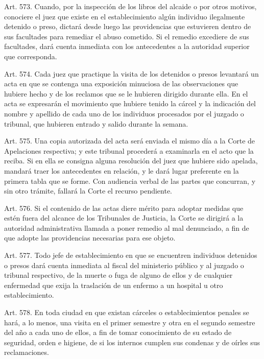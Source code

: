     Art. 573. Cuando, por la inspección de los libros del alcaide o por otros motivos, conociere el juez que existe en el establecimiento algún individuo ilegalmente detenido o preso, dictará desde luego las providencias que estuvieren dentro de sus facultades para remediar el abuso cometido. Si el remedio excediere de sus facultades, dará cuenta inmediata con los antecedentes a la autoridad superior que corresponda.



    Art. 574. Cada juez que practique la visita de los detenidos o presos levantará un acta en que se contenga una exposición minuciosa de las observaciones que hubiere hecho y de los reclamos que se le hubieren dirigido durante ella. En el acta se expresarán el movimiento que hubiere tenido la cárcel y la indicación del nombre y apellido de cada uno de los individuos procesados por el juzgado o tribunal, que hubieren entrado y salido durante la semana.



    Art. 575. Una copia autorizada del acta será enviada el mismo día a la Corte de Apelaciones respectiva; y este tribunal procederá a examinarla en el acto que la reciba. Si en ella se consigna alguna resolución del juez que hubiere sido apelada, mandará traer los antecedentes en relación, y le dará lugar preferente en la primera tabla que se forme. Con audiencia verbal de las partes que concurran, y sin otro trámite, fallará la Corte el recurso pendiente.

    Art. 576. Si el contenido de las actas diere mérito para adoptar medidas que estén fuera del alcance de los Tribunales de Justicia, la Corte se dirigirá a la autoridad administrativa llamada a poner remedio al mal denunciado, a fin de que adopte las providencias necesarias para ese objeto.

    Art. 577. Todo jefe de establecimiento en que se encuentren individuos detenidos o presos dará cuenta inmediata al fiscal del ministerio público y al juzgado o tribunal respectivo, de la muerte o fuga de alguno de ellos y de cualquier enfermedad que exija la traslación de un enfermo a un hospital u otro establecimiento.


    Art. 578. En toda ciudad en que existan cárceles o establecimientos penales se hará, a lo menos, una visita en el primer semestre y otra en el segundo semestre del año a cada uno de ellos, a fin de tomar conocimiento de su estado de seguridad, orden e higiene, de si los internos cumplen sus condenas y de oírles sus reclamaciones.




